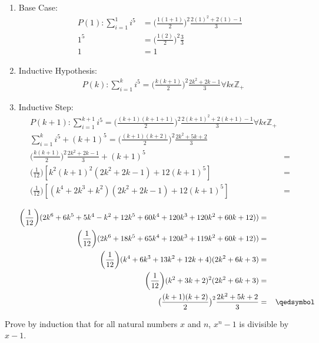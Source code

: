 \documentclass[12pt]{article}
\begin{document}
\begin{enumerate}

\item Base Case:\\
\begin{align*}
P(1):\sum\limits_{i = 1}^{1} i^5 &= \big(\frac{1(1 + 1)}{2}\big)^2\frac{2(1)^2+2(1)-1}{3}\\
1^5 &= \big(\frac{1(2)}{2}\big)^2\frac{3}{3}\\
1 &= 1
\end{align*}

\item Inductive Hypothesis:
\begin{align*}
&P(k):\sum\limits_{i = 1}^{k} i^5 = \big(\frac{k(k + 1)}{2}\big)^2\frac{2k^2+2k-1}{3} \forall k \epsilon \mathbb{Z}_+
\end{align*}
\item Inductive Step:
\begin{align*}
P(k+1):\sum\limits_{i = 1}^{k+1} i^5 = \big(\frac{(k+1)(k + 1 + 1)}{2}\big)^2\frac{2(k+1)^2+2(k+1)-1}{3} \forall k \epsilon \mathbb{Z}_+ \\
\sum\limits_{i = 1}^{k} i^5 + (k + 1)^5 = \big(\frac{(k+1)(k + 2)}{2}\big)^2\frac{2k^2+5k+2}{3} \\
\bigg(\frac{k(k + 1)}{2}\bigg)^2\frac{2k^2+2k-1}{3} + (k + 1)^5 &=\\
\bigg(\frac{1}{12}\bigg)[k^2(k+1)^2(2k^2+2k-1)+12(k+1)^5]&= \\
\bigg(\frac{1}{12}\bigg)[(k^4+2k^3+k^2)(2k^2+2k-1)+12(k+1)^5]&=\\
\end{align*}
\begin{align*}
\bigg(\frac{1}{12}\bigg)(2k^6+6k^5+5k^4-k^2+12k^5+60k^4+120k^3+120k^2+60k+12))&=\\
\bigg(\frac{1}{12}\bigg)(2k^6+18k^5+65k^4+120k^3+119k^2+60k+12))&=\\
\bigg(\frac{1}{12}\bigg)(k^4+6k^3+13k^2+12k+4)(2k^2+6k+3)&=\\
\bigg(\frac{1}{12}\bigg)(k^2+3k+2)^2(2k^2+6k+3)&=\\
\big(\frac{(k+1)(k + 2)}{2}\big)^2\frac{2k^2+5k+2}{3}&=\hspace{0.3cm}\qedsymbol
\end{align*}
\end{enumerate}
Prove by induction that for all natural numbers \begin{math}x\end{math} and \begin{math}n\end{math}, \begin{math}x^n - 1\end{math} is divisible by \begin{math}x - 1\end{math}.\\\\
\end{document}
